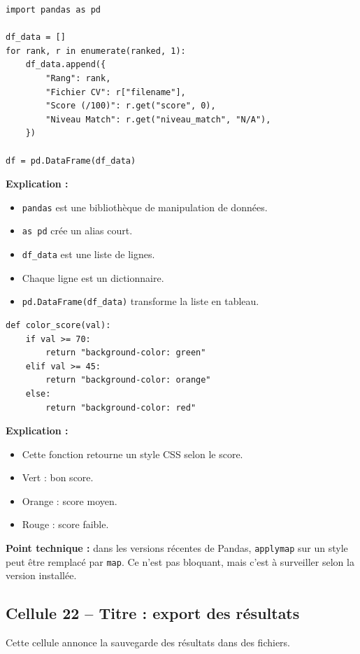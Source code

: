 \documentclass[12pt,a4paper]{article}
\begin{document}
\begin{lstlisting}[style=pythonstyle]
import pandas as pd

df_data = []
for rank, r in enumerate(ranked, 1):
    df_data.append({
        "Rang": rank,
        "Fichier CV": r["filename"],
        "Score (/100)": r.get("score", 0),
        "Niveau Match": r.get("niveau_match", "N/A"),
    })

df = pd.DataFrame(df_data)
\end{lstlisting}

\textbf{Explication :}
\begin{itemize}
  \item \texttt{pandas} est une bibliothèque de manipulation de données.
  \item \texttt{as pd} crée un alias court.
  \item \texttt{df\_data} est une liste de lignes.
  \item Chaque ligne est un dictionnaire.
  \item \texttt{pd.DataFrame(df\_data)} transforme la liste en tableau.
\end{itemize}

\begin{lstlisting}[style=pythonstyle]
def color_score(val):
    if val >= 70:
        return "background-color: green"
    elif val >= 45:
        return "background-color: orange"
    else:
        return "background-color: red"
\end{lstlisting}

\textbf{Explication :}
\begin{itemize}
  \item Cette fonction retourne un style CSS selon le score.
  \item Vert : bon score.
  \item Orange : score moyen.
  \item Rouge : score faible.
\end{itemize}

\textbf{Point technique :} dans les versions récentes de Pandas, \texttt{applymap} sur un style peut être remplacé par \texttt{map}. Ce n'est pas bloquant, mais c'est à surveiller selon la version installée.

\subsection{Cellule 22 -- Titre : export des résultats}

Cette cellule annonce la sauvegarde des résultats dans des fichiers.
\end{document}
